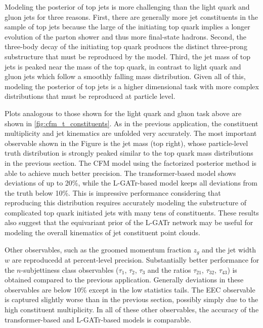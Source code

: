 Modeling the posterior of top jets is more challenging than the light quark and gluon jets for three reasons.
First, there are generally more jet constituents in the sample of top jets because the large \pt of the initiating top quark implies a longer evolution of the parton shower and thus more final-state hadrons.
Second, the three-body decay of the initiating top quark produces the distinct three-prong substructure that must be reproduced by the model.
Third, the jet mass of top jets is peaked near the mass of the top quark, in contrast to light quark and gluon jets which follow a smoothly falling mass distribution.
Given all of this, modeling the posterior of top jets is a higher dimensional task with more complex distributions that must be reproduced at particle level.

Plots analogous to those shown for the light quark and gluon task above are shown in \cref{fig:cfm_t_constituents}.
As in the previous application, the constituent multiplicity and jet kinematics are unfolded very accurately.
The most important observable shown in the Figure is the jet mass (top right), whose particle-level truth distribution is strongly peaked similar to the top quark mass distributions in the previous section.
The CFM model using the factorized posterior method is able to achieve much better precision.
The transformer-based model shows deviations of up to 20\%, while the L-GATr-based model keeps all deviations from the truth below 10\%.
This is impressive performance considering that reproducing this distribution requires accurately modeling the substructure of complicated top quark initiated jets with many tens of constituents.
These results also suggest that the equivariant prior of the L-GATr network may be useful for modeling the overall kinematics of jet constituent point clouds.

Other observables, such as the groomed momentum fraction $z_g$ and the jet width $w$ are reproducedd at percent-level precision.
Substantially better performance for the $n$-subjettiness class observables ($\tau_1$, $\tau_2$, $\tau_3$ and the ratios $\tau_{21}$, $\tau_{32}$, $\tau_{43}$) is obtained compared to the previous application.
Generally deviations in these observables are below 10\% except in the low statistics tails.
The EEC observable is captured slightly worse than in the previous section, possibly simply due to the high constituent multiplicity.
In all of these other observables, the accuracy of the transformer-based and L-GATr-based models is comparable.

